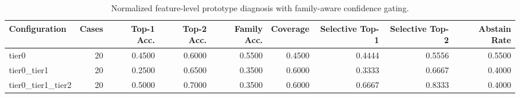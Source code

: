 \begin{table}[t]
\centering
\caption{Normalized feature-level prototype diagnosis with family-aware confidence gating.}
\label{tab:dice_stressor_hierarchical_diagnosis}
\footnotesize
\begin{tabular}{lrrrrrrrr}
\toprule
Configuration & Cases & Top-1 Acc. & Top-2 Acc. & Family Acc. & Coverage & Selective Top-1 & Selective Top-2 & Abstain Rate \\
\midrule
tier0 & 20 & 0.4500 & 0.6000 & 0.5500 & 0.4500 & 0.4444 & 0.5556 & 0.5500 \\
tier0_tier1 & 20 & 0.2500 & 0.6500 & 0.3500 & 0.6000 & 0.3333 & 0.6667 & 0.4000 \\
tier0_tier1_tier2 & 20 & 0.5000 & 0.7000 & 0.3500 & 0.6000 & 0.6667 & 0.8333 & 0.4000 \\
\bottomrule
\end{tabular}

\end{table}
